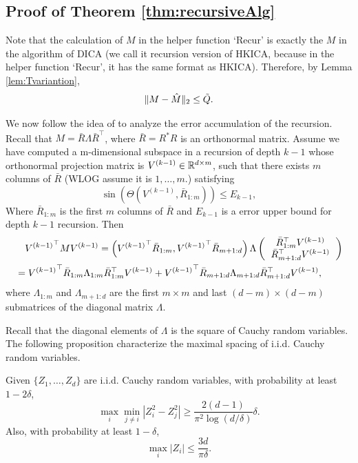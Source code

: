 \subsection{Proof of Theorem \ref{thm:recursiveAlg}}
Note that the calculation of $M$ in the helper function `Recur' is exactly the $M$ in the algorithm of DICA (we call it recursion version of HKICA, because in the helper function `Recur', it has the same format as HKICA).
Therefore, by Lemma \ref{lem:Tvariantion},
\[
\|M-\hat{M}\|_2 \le \tilde{Q}.
\]

We now follow the idea of \citet{vempala2014max} to analyze the error accumulation of the recursion.
Recall that $M = \bar{R}\Lambda\bar{R}^{\top}$, where $\bar{R} = R^*R$ is an orthonormal matrix.
Assume we have computed a m-dimensional subspace in a recursion of depth $k-1$ whose orthonormal projection matrix is $V^{(k-1)} \in \mathbb{R}^{d\times m}$, such that there exists $m$ columns of $\bar{R}$ (WLOG assume it is $1,\ldots,m$.) satisfying
\[
\sin\left(\Theta\left(V^{(k-1)}, \bar{R}_{1:m}\right)\right) \le E_{k-1},
\] 
Where $\bar{R}_{1:m}$ is the first $m$ columns of $\bar{R}$ and $E_{k-1}$ is a error upper bound for depth $k-1$ recursion.
Then
\begin{align*}
& \quad {V^{(k-1)}}^\top MV^{(k-1)} = \left( {V^{(k-1)}}^\top\bar{R}_{1:m}, {V^{(k-1)}}^\top\bar{R}_{m+1:d}\right)\Lambda
\left(
\begin{tabular}{c}
$\bar{R}_{1:m}^{\top} V^{(k-1)}$ \\
$\bar{R}_{m+1:d}^{\top} V^{(k-1)}$
\end{tabular}
\right) \\
& = {V^{(k-1)}}^\top\bar{R}_{1:m}\Lambda_{1:m} \bar{R}_{1:m}^{\top} V^{(k-1)} + {V^{(k-1)}}^\top\bar{R}_{m+1:d}\Lambda_{m+1:d}\bar{R}_{m+1:d}^{\top} V^{(k-1)},
\end{align*}
where $\Lambda_{1:m}$ and $\Lambda_{m+1:d}$ are the first $m\times m$  and last $(d-m)\times (d-m)$ submatrices of the diagonal matrix $\Lambda$.

Recall that the diagonal elements of $\Lambda$ is the square of Cauchy random variables. The following proposition characterize the maximal spacing of i.i.d. Cauchy random variables.
\begin{proposition}
\label{prop:maximalGapCauchy}
Given $\{Z_1,\ldots, Z_d\}$ are i.i.d. Cauchy random variables, with probability at least $1-2\delta$, 
\[
\max_i \min_{j\neq i} |Z_i^2 - Z_j^2| \ge \frac{2(d-1)}{\pi^2 \log(d/\delta)}\delta.
\]
Also, with probability at least $1-\delta$,
\[
\max_i |Z_i| \le \frac{3d}{\pi\delta}.
\]
\end{proposition}

